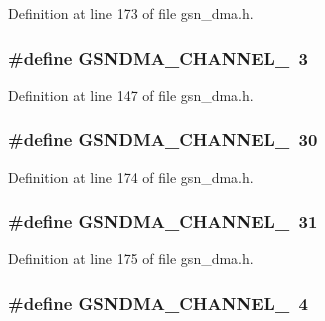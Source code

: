 Definition at line 173 of file gsn\_\-dma.h.

\hypertarget{a00484_a9dfd424f980f9c35bcc55e66916d8605}{
\subsubsection[{GSNDMA\_\-CHANNEL\_\-3}]{\setlength{\rightskip}{0pt plus 5cm}\#define GSNDMA\_\-CHANNEL\_~3}}
\label{a00484_a9dfd424f980f9c35bcc55e66916d8605}


Definition at line 147 of file gsn\_\-dma.h.

\hypertarget{a00484_aa8aa2ddbe72b70f74bcffe9368b7d872}{
\subsubsection[{GSNDMA\_\-CHANNEL\_\-30}]{\setlength{\rightskip}{0pt plus 5cm}\#define GSNDMA\_\-CHANNEL\_~30}}
\label{a00484_aa8aa2ddbe72b70f74bcffe9368b7d872}


Definition at line 174 of file gsn\_\-dma.h.

\hypertarget{a00484_abb1e8fb25e50fad258a291a11bd80d37}{
\subsubsection[{GSNDMA\_\-CHANNEL\_\-31}]{\setlength{\rightskip}{0pt plus 5cm}\#define GSNDMA\_\-CHANNEL\_~31}}
\label{a00484_abb1e8fb25e50fad258a291a11bd80d37}


Definition at line 175 of file gsn\_\-dma.h.

\hypertarget{a00484_a62f3ee88b0075bbb2d86216cf011a601}{
\subsubsection[{GSNDMA\_\-CHANNEL\_\-4}]{\setlength{\rightskip}{0pt plus 5cm}\#define GSNDMA\_\-CHANNEL\_~4}}
\label{a00484_a62f3ee88b0075bbb2d86216cf011a601}


